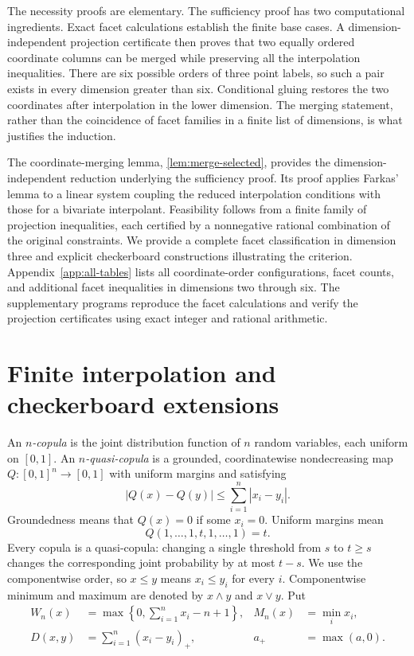 \documentclass[a4paper,11pt]{amsart}
\numberwithin{equation}{section}
\theoremstyle{definition}
\theoremstyle{remark}
\begin{document}
The necessity proofs are elementary. The sufficiency proof has two
computational ingredients. Exact facet calculations establish the finite
base cases. A dimension-independent projection certificate then proves
that two equally ordered coordinate columns can be merged while
preserving all the interpolation inequalities. There are six possible
orders of three point labels, so such a pair exists in every dimension
greater than six. Conditional gluing restores the two coordinates after
interpolation in the lower dimension. The merging statement, rather than
the coincidence of facet families in a finite list of dimensions, is what
justifies the induction.

The coordinate-merging lemma, \cref{lem:merge-selected}, provides the
dimension-independent reduction underlying the sufficiency proof.
Its proof applies Farkas' lemma to a linear system coupling the reduced
interpolation conditions with those for a bivariate interpolant.
Feasibility follows from a finite family of projection inequalities,
each certified by a nonnegative rational combination of the original
constraints. We provide a complete facet classification in dimension
three and explicit checkerboard constructions illustrating the criterion.
Appendix~\ref{app:all-tables} lists all coordinate-order configurations,
facet counts, and additional facet inequalities in dimensions two through
six. The supplementary programs reproduce the facet calculations and
verify the projection certificates using exact integer and rational
arithmetic.

\section{Finite interpolation and checkerboard extensions}\label{sec:prelim}
An \emph{$n$-copula} is the joint distribution function of $n$ random
variables, each uniform on $[0,1]$. An \emph{$n$-quasi-copula} is a grounded,
coordinatewise nondecreasing map $Q\colon[0,1]^n\to[0,1]$ with uniform margins
and satisfying
\[
 |Q(x)-Q(y)|\leq\sum_{i=1}^n|x_i-y_i|.
\]
Groundedness means that $Q(x)=0$ if some $x_i=0$. Uniform margins mean
\[Q(1,\ldots,1,t,1,\ldots,1)=t.\]
Every copula is a quasi-copula: changing a single threshold from $s$ to
$t\geq s$ changes the corresponding joint probability by at most $t-s$.
We use the componentwise order, so $x\leq y$ means $x_i\leq y_i$ for every
$i$. Componentwise minimum and maximum are denoted by $x\wedge y$ and
$x\vee y$. Put
\begin{align*}
 W_n(x)&=\max\left\{0,\sum_{i=1}^n x_i-n+1\right\},
 &M_n(x)&=\min_i x_i,\\
 D(x,y)&=\sum_{i=1}^n(x_i-y_i)_+,
 &a_+&=\max(a,0).
\end{align*}
\end{document}
